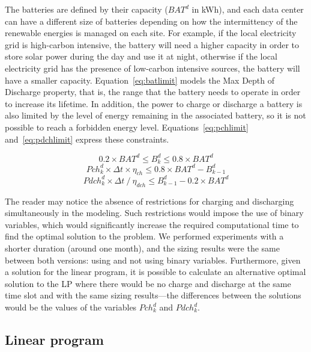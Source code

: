 The batteries are defined by their capacity ($BAT^d$ in kWh), and each data center can have a different size of batteries depending on how the intermittency of the renewable energies is managed on each site. For example, if the local electricity grid is high-carbon intensive, the battery will need a higher capacity in order to store solar power during the day and use it at night, otherwise if the local electricity grid has the presence of low-carbon intensive sources, the battery will have a smaller capacity. Equation~\eqref{eq:batlimit} models the Max Depth of Discharge property, that is, the range that the battery needs to operate in order to increase its lifetime. In addition, the power to charge or discharge a battery is also limited by the level of energy remaining in the associated battery, so it is not possible to reach a forbidden energy level. Equations~\eqref{eq:pchlimit} and~\eqref{eq:pdchlimit} express these constraints.

\begin{equation} \label{eq:batlimit}
0.2\times BAT^d\leq B_k^d\leq 0.8\times BAT^d
\end{equation}
\begin{equation} \label{eq:pchlimit}
Pch^d_k \times \Delta t \times \eta_{ch} \leq 0.8\times BAT^d - B^d_{k-1}
\end{equation}
\begin{equation} \label{eq:pdchlimit}
Pdch^d_k \times \Delta t\ / \ \eta_{dch} \leq B^d_{k-1} - 0.2\times BAT^d
\end{equation}


The reader may notice the absence of restrictions for charging and discharging simultaneously in the modeling. Such restrictions would impose the use of binary variables, which would significantly increase the required computational time to find the optimal solution to the problem. We performed experiments with a shorter duration (around one month), and the sizing results were the same between both versions: using and not using binary variables. Furthermore, given a solution for the linear program, it is possible to calculate an alternative optimal solution to the LP where there would be no charge and discharge at the same time slot and with the same sizing results---the differences between the solutions would be the values of the variables $Pch_k^d$ and $Pdch_k^d$.

\subsection{Linear program}

